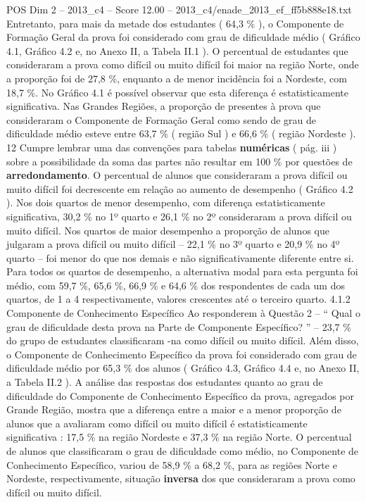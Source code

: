 \begin{textsample}{POS Dim 2 – 2013\_c4 – Score 12.00 – 2013\_c4/enade\_2013\_ef\_ff5b888e18.txt}
Entretanto, para mais da metade dos estudantes ( 64,3 \% ), o Componente de Formação Geral da prova foi considerado com grau de dificuldade médio ( Gráfico 4.1, Gráfico 4.2 e, no Anexo II, a Tabela II.1 ).
O percentual de estudantes que consideraram a prova como difícil ou muito difícil foi maior na região Norte, onde a proporção foi de 27,8 \%, enquanto a de menor incidência foi a Nordeste, com 18,7 \%.
No Gráfico 4.1 é possível observar que esta diferença é estatisticamente significativa.
Nas Grandes Regiões, a proporção de presentes à prova que consideraram o Componente de Formação Geral como sendo de grau de dificuldade médio esteve entre 63,7 \% ( região Sul ) e 66,6 \% ( região Nordeste ). 12 Cumpre lembrar uma das convenções para tabelas \textbf{numéricas} ( pág. iii ) sobre a possibilidade da soma das partes não resultar em 100 \% por questões de \textbf{arredondamento}.
O percentual de alunos que consideraram a prova difícil ou muito difícil foi decrescente em relação ao aumento de desempenho ( Gráfico 4.2 ).
Nos dois quartos de menor desempenho, com diferença estatisticamente significativa, 30,2 \% no 1º quarto e 26,1 \% no 2º consideraram a prova difícil ou muito difícil.
Nos quartos de maior desempenho a proporção de alunos que julgaram a prova difícil ou muito difícil – 22,1 \% no 3º quarto e 20,9 \% no 4º quarto – foi menor do que nos demais e não significativamente diferente entre si.
Para todos os quartos de desempenho, a alternativa modal para esta pergunta foi médio, com 59,7 \%, 65,6 \%, 66,9 \% e 64,6 \% dos respondentes de cada um dos quartos, de 1 a 4 respectivamente, valores crescentes até o terceiro quarto. 4.1.2 Componente de Conhecimento Específico Ao responderem à Questão 2 – “ Qual o grau de dificuldade desta prova na Parte de Componente Específico? ” – 23,7 \% do grupo de estudantes classificaram -na como difícil ou muito difícil.
Além disso, o Componente de Conhecimento Específico da prova foi considerado com grau de dificuldade médio por 65,3 \% dos alunos ( Gráfico 4.3, Gráfico 4.4 e, no Anexo II, a Tabela II.2 ).
A análise das respostas dos estudantes quanto ao grau de dificuldade do Componente de Conhecimento Específico da prova, agregados por Grande Região, mostra que a diferença entre a maior e a menor proporção de alunos que a avaliaram como difícil ou muito difícil é estatisticamente significativa : 17,5 \% na região Nordeste e 37,3 \% na região Norte.
O percentual de alunos que classificaram o grau de dificuldade como médio, no Componente de Conhecimento Específico, variou de 58,9 \% a 68,2 \%, para as regiões Norte e Nordeste, respectivamente, situação \textbf{inversa} dos que consideraram a prova como difícil ou muito difícil.

\end{textsample}
